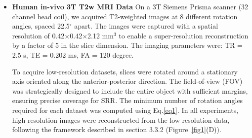 \documentclass[AMA,STIX2COL]{MRM}
\begin{document}
\begin{itemize}
\item \textbf{Human in-vivo 3T T2w MRI Data}
On a 3T Siemens Prisma scanner (32 channel head coil), we acquired T2-weighted images at 8 different rotation angles, spaced 22.5$^\circ$ apart. The images were captured with a spatial resolution of 0.42$\times$0.42$\times$2.12 mm$^{3}$ to enable a super-resolution reconstruction by a factor of 5 in the slice dimension. The imaging parameters were: TR = 2.5 s, TE = 0.202 ms, FA = 120 degree. 

To acquire low-resolution datasets, slices were rotated around a stationary axis oriented along the anterior-posterior direction. The field-of-view (FOV) was strategically designed to include the entire object with sufficient margins, ensuring precise coverage for SRR. The minimum number of rotation angles required for each dataset was computed using Eq.\ref{eq1}. %
In all experiments, high-resolution images were reconstructed from the low-resolution data, following the framework described in section 3.3.2 (Figure~\ref{fig1}(D)).
\end{itemize}


\end{document}

